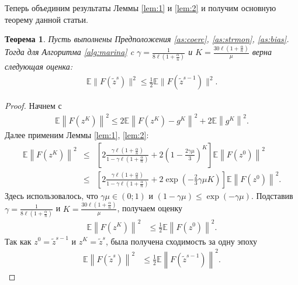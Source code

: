 \documentclass{ProcISPRAS}
\newtheorem{theorem}{Теорема}
\begin{document}
Теперь объединим результаты Леммы \ref{lem:1} и \ref{lem:2} и получим основную теорему данной статьи.

\begin{theorem} \label{th:1}
Пусть выполнены Предположения \ref{as:coerc}, \ref{as:strmon}, \ref{as:bias}. Тогда для Алгоритма \ref{alg:marina} c $\gamma =\frac{1}{8\ell\left(1+\frac{\alpha}{n}\right)}$ и $K = \frac{30\ell\left(1 + \frac{\alpha}{n}\right)}{\mu}$ верна следующая оценка:
\begin{eqnarray*}
    \mathbb E\| F(\tilde z^s) \|^2 \leqslant \frac{1}{2}\mathbb E\|F(\tilde z^{{s-1}})\|^2.
\end{eqnarray*}
\end{theorem}
\begin{proof}
Начнем с
\begin{eqnarray*}
    \mathbb E\left\| F (z^K) \right\|^2 \leqslant 2 \mathbb E\left\| F(z^K) - g^K \right\|^2 + 2 \mathbb E\left\| g^K \right\|^2.
\end{eqnarray*}
Далее применим Леммы \ref{lem:1}, \ref{lem:2}:
\begin{eqnarray*}
    \mathbb E\left\| F (z^K) \right\|^2 &\leqslant& \left[2\frac{\gamma\ell\left(1+\frac{\alpha}{n}\right)}{1 - \gamma\ell\left(1+\frac{\alpha}{n}\right)} + 2\left(1 - \frac{2\gamma\mu}{3}\right)^K\right]\mathbb E\left\| F (z^0) \right\|^2\\
    &\leqslant& \left[2\frac{\gamma\ell\left(1+\frac{\alpha}{n}\right)}{1 - \gamma\ell\left(1+\frac{\alpha}{n}\right)} + 2\exp\left(-\frac{2}{3}\gamma\mu K\right)\right]\mathbb E\left\| F (z^0) \right\|^2.
\end{eqnarray*}
Здесь использовалось, что $\gamma \mu \in (0;1)$ и $(1 - \gamma \mu)\leq \exp(-\gamma\mu)$. Подставив $\gamma = \frac{1}{8\ell\left(1+\frac{\alpha}{n}\right)}$ и $K = \frac{30\ell\left(1+\frac{\alpha}{n}\right)}{\mu}$, получаем оценку
\begin{align*}
    \mathbb E\left\| F (z^K) \right\|^2 &\leqslant \frac{1}{2} \mathbb E\left\| F (z^0) \right\|^2.
\end{align*}
Так как $z^0 = \tilde z^{s-1}$ и $z^K = \tilde z^s$, была получена сходимость за одну эпоху
\begin{align*}
    \mathbb E\left\| F (\tilde z^s) \right\|^2 &\leqslant \frac{1}{2} \mathbb E\left\| F (\tilde z^{s-1}) \right\|^2.
\end{align*}
\end{proof}
\end{document}

